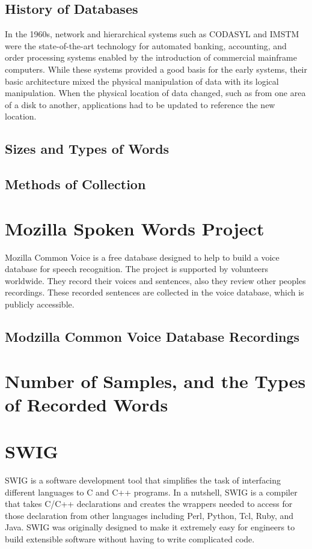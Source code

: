 \documentclass[english,12pt,oneside,a4paper]{article}
\begin{document}
\begin{center}
		\subsection{History of Databases}
		In the 1960s, network and hierarchical systems such as CODASYL and IMSTM were the
		state-of-the-art technology for automated banking, accounting, and order processing
		systems enabled by the introduction of commercial mainframe computers. While these
		systems provided a good basis for the early systems, their basic architecture mixed the
		physical manipulation of data with its logical manipulation. When the physical location of
		data changed, such as from one area of a disk to another, applications had to be updated
		to reference the new location.
		\subsection{Sizes and Types of Words}
		
		\subsection{Methods of Collection}
		
		\section{Mozilla Spoken Words Project}
		Mozilla Common Voice is a free database designed to help to build a voice database for speech recognition. The project is supported by volunteers worldwide. They record their voices and sentences, also they review other peoples recordings. These recorded sentences are collected in the voice database, which is publicly accessible.
		\subsection{Modzilla Common Voice Database Recordings}
		
		\section{Number of Samples, and the Types of Recorded Words}
		
		\section{SWIG}
		SWIG is a software development tool that simplifies the task of interfacing different languages to C and C++ programs. In a nutshell, SWIG is a compiler that takes C/C++ declarations and creates the wrappers needed to access for those declaration from other languages including Perl, Python, Tcl, Ruby, and Java. SWIG was originally designed to make it extremely easy for engineers to build extensible software without having to write complicated code.

\end{center}
\end{document}
